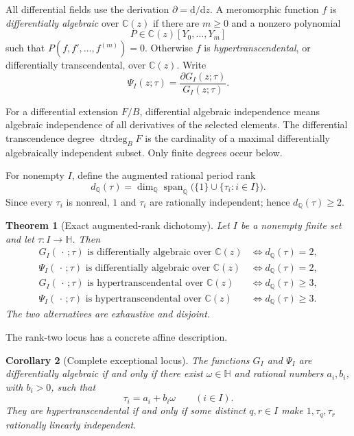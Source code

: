 \documentclass[11pt]{article}
\numberwithin{equation}{section}
\newtheorem{theorem}{Theorem}[section]
\newtheorem{corollary}[theorem]{Corollary}
\theoremstyle{definition}
\theoremstyle{remark}
\newcommand{\C}{\mathbb C}
\newcommand{\Q}{\mathbb Q}
\newcommand{\HH}{\mathbb H}
\newcommand{\Span}{\operatorname{span}}
\newcommand{\dtrdeg}{\operatorname{dtrdeg}}
\newcommand{\dd}{\mathrm d}
\begin{document}
All differential fields use the derivation $\partial=\dd/\dd z$.  A
meromorphic function $f$ is \emph{differentially algebraic} over $\C(z)$ if
there are $m\geq0$ and a nonzero polynomial
\[
 P\in\C(z)[Y_0,\ldots,Y_m]
\]
such that $P(f,f',\ldots,f^{(m)})=0$.  Otherwise $f$ is
\emph{hypertranscendental}, or differentially transcendental, over $\C(z)$.
Write
\[
 \Psi_I(z;\tau)=\frac{\partial G_I(z;\tau)}{G_I(z;\tau)}.
\]

For a differential extension $F/B$, differential algebraic independence
means algebraic independence of all derivatives of the selected elements.
The differential transcendence degree $\dtrdeg_BF$ is the cardinality of a
maximal differentially algebraically independent subset.  Only finite
degrees occur below.

For nonempty $I$, define the augmented rational period rank
\begin{equation}
 d_{\Q}(\tau)=
 \dim_{\Q}\Span_{\Q}\bigl(\{1\}\cup\{\tau_i:i\in I\}\bigr).
 \label{eq:rank}
\end{equation}
Since every $\tau_i$ is nonreal, $1$ and $\tau_i$ are rationally
independent; hence $d_{\Q}(\tau)\geq2$.

\begin{theorem}[Exact augmented-rank dichotomy]
\label{thm:main}
Let $I$ be a nonempty finite set and let $\tau:I\to\HH$.  Then
\begin{align}
 G_I(\,\cdot\,;\tau)\text{ is differentially algebraic over }\C(z)
 &\Longleftrightarrow d_{\Q}(\tau)=2,
 \label{eq:main-G-DA}\\
 \Psi_I(\,\cdot\,;\tau)\text{ is differentially algebraic over }\C(z)
 &\Longleftrightarrow d_{\Q}(\tau)=2,
 \label{eq:main-Psi-DA}\\
 G_I(\,\cdot\,;\tau)\text{ is hypertranscendental over }\C(z)
 &\Longleftrightarrow d_{\Q}(\tau)\geq3,
 \label{eq:main-G-HT}\\
 \Psi_I(\,\cdot\,;\tau)\text{ is hypertranscendental over }\C(z)
 &\Longleftrightarrow d_{\Q}(\tau)\geq3.
 \label{eq:main-Psi-HT}
\end{align}
The two alternatives are exhaustive and disjoint.
\end{theorem}

The rank-two locus has a concrete affine description.

\begin{corollary}[Complete exceptional locus]
\label{cor:affine}
The functions $G_I$ and $\Psi_I$ are differentially algebraic if and only if
there exist $\omega\in\HH$ and rational numbers $a_i,b_i$, with $b_i>0$,
such that
\begin{equation}
 \tau_i=a_i+b_i\omega\qquad(i\in I).
 \label{eq:rational-affine}
\end{equation}
They are hypertranscendental if and only if some distinct $q,r\in I$ make
$1,\tau_q,\tau_r$ rationally linearly independent.
\end{corollary}
\end{document}
